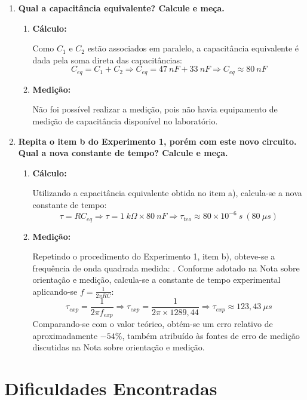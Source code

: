 \documentclass[a4paper,oneside,10pt]{article}
\begin{document}
\begin{enumerate}[label=\alph*]
	\item \textbf{Qual a capacitância equivalente? Calcule e meça.}
	\begin{enumerate}
		\item \textbf{Cálculo:}
		
		Como $C_1$ e $C_2$ estão associados em paralelo, a capacitância equivalente é dada pela soma direta das capacitâncias:
		$$C_{eq} = C_1 + C_2 \Rightarrow C_{eq} = 47\ nF + 33\ nF \Rightarrow \boxed{C_{eq} \approx 80\ nF}$$
		
		\item \textbf{Medição:}
		
		Não foi possível realizar a medição, pois não havia equipamento de medição de capacitância disponível no laboratório.
		
	\end{enumerate}
	
	\item \textbf{Repita o item b do Experimento 1, porém com este novo circuito. Qual a nova constante de tempo? Calcule e meça.}
	\begin{enumerate}
		\item \textbf{Cálculo:}
		
		Utilizando a capacitância equivalente obtida no item a), calcula-se a nova constante de tempo:
		$$\tau = RC_{eq} \Rightarrow \tau = 1\ k\Omega \times 80\ nF \Rightarrow \boxed{\tau_{teo} \approx 80\times 10^{-6}\ s\ (80\ \mu s)}$$
		
		\item \textbf{Medição:}
		
		Repetindo o procedimento do Experimento 1, item b), obteve-se a frequência de onda quadrada medida: . Conforme adotado na Nota sobre orientação e medição, calcula-se a constante de tempo experimental aplicando-se $f = \frac{1}{2\pi RC}$:
		$$\tau_{exp} = \frac{1}{2\pi f_{exp}} \Rightarrow \tau_{exp} = \frac{1}{2\pi \times 1289,44} \Rightarrow \boxed{\tau_{exp} \approx 123,43\ \mu s}$$
		Comparando-se com o valor teórico, obtém-se um erro relativo de aproximadamente $-54\%$, também atribuído às fontes de erro de medição discutidas na Nota sobre orientação e medição.
		
	\end{enumerate}
	
\end{enumerate}

\section{Dificuldades Encontradas}
\end{document}
